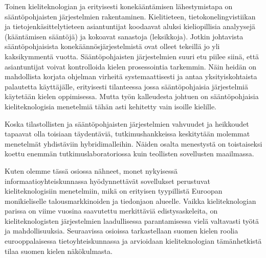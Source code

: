 \documentclass[]{../../metanetpaper}
\begin{document}
\begin{multicols}{2}
Toinen kieliteknologian ja erityisesti konekääntämisen lähestymistapa on
sääntöpohjaisten järjestelmien rakentaminen. Kielitieteen,
tietokonelingvistiikan ja tietojenkäsittelytieteen asiantuntijat koodaavat
aluksi kieliopillisia analyysejä (kääntämisen sääntöjä) ja kokoavat sanastoja
(leksikkoja). Jotkin johtavista sääntöpohjaisista konekäännösjärjestelmistä
ovat olleet tekeillä jo yli kaksikymmentä vuotta. Sääntöpohjaisten
järjestelmien suuri etu piilee siinä, että asiantuntijat voivat kontrolloida
kielen prosessointia tarkemmin. Näin heidän on mahdollista korjata ohjelman
virheitä systemaattisesti ja antaa yksityiskohtaista palautetta käyttäjälle,
erityisesti tilanteessa jossa sääntöpohjaisia järjestelmiä käytetään kielen
oppimisessa. Mutta työn kalleudesta johtuen on sääntöpohjaisia
kieliteknologisia menetelmiä tähän asti kehitetty vain isoille kielille.

Koska tilastollisten ja sääntöpohjaisten järjestelmien vahvuudet ja heikkoudet
tapaavat olla toisiaan täydentäviä, tutkimushankkeissa keskitytään molemmat
menetelmät yhdistäviin hybridimalleihin. Näiden osalta menestystä on
toistaiseksi koettu enemmän tutkimuslaboratoriossa kuin teollisten sovellusten
maailmassa.

Kuten olemme tässä osiossa nähneet, monet nykyisessä informaatioyhteiskunnassa
hyödynnettävät sovellukset perustuvat kieliteknologisiin menetelmiin, mikä on
erityisen tyypillistä Euroopan monikieliselle talousmarkkinoiden ja tiedonjaon
alueelle. Vaikka kieliteknologian parissa on viime vuosina saavutettu
merkittäviä edistysaskeleita, on kieliteknologisten järjestelmien laadullisessa
parantamisessa vielä valtavasti työtä ja mahdollisuuksia. Seuraavissa osioissa
tarkastellaan suomen kielen roolia eurooppalaisessa tietoyhteiskunnassa ja
arvioidaan kieliteknologian tämänhetkistä tilaa suomen kielen näkökulmasta.


\end{multicols}
\clearpage
{}
\end{document}
